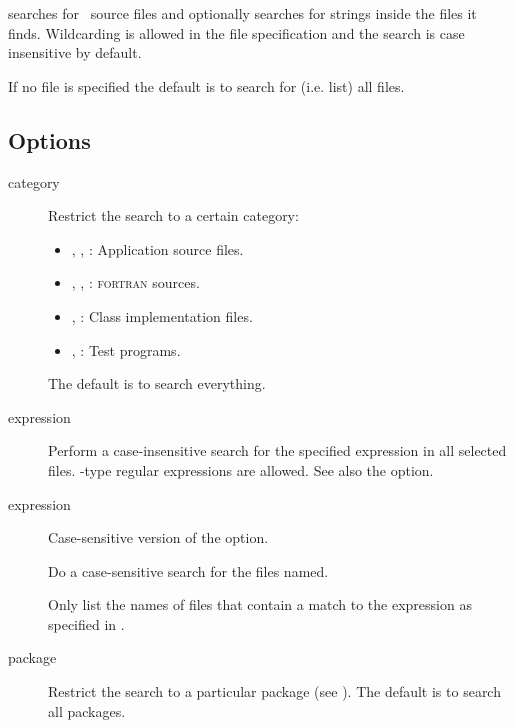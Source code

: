  searches for \aipspp\ source files and optionally searches for
strings inside the files it finds.  Wildcarding is allowed in the file
specification and the search is case insensitive by default.

If no file is specified the default is to search for (i.e. list) all files.

\subsection*{Options}

\begin{description}
\item[ category]
   Restrict the search to a certain category:
   \begin{itemize}
      \item
      , , : Application source files.

      \item
      , , : \textsc{fortran} sources.

      \item
      , : Class implementation files.

      \item
      , : Test programs.
   \end{itemize}
   The default is to search everything.

\item[ expression]
   Perform a case-insensitive search for the specified expression in all
   selected files.  -type regular expressions are allowed.
   See also the  option.

\item[ expression]
   Case-sensitive version of the  option.

\item[]
   Do a case-sensitive search for the files named.

\item[]
   Only list the names of files that contain a match to the expression 
   as specified in .

\item[ package]
   Restrict the search to a particular package (see ).
   The default is to search all packages.
\end{description}

